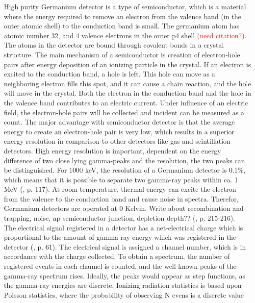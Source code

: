 High purity Germanium detector is a type of semiconductor, which is a material where the energy required to remove an electron from the valence band (in the outer atomic shell) to the conduction band is small. The germanium atom has atomic number 32, and 4 valence electrons in the outer p4 shell \textcolor{red}{(need citation?)}. The atoms in the detector are bound through covalent bonds in a crystal structure. The main mechanism of a semiconductor is creation of electron-hole pairs after energy deposition of an ionizing particle in the crystal. If an electron is excited to the conduction band, a hole is left. This hole can move as a neighboring electron fills this spot, and it can cause a chain reaction, and the hole will move in the crystal. Both the electron in the conduction band and the hole in the valence band contributes to an electric current. Under influence of an electric field, the electron-hole pairs will be collected and incident can be measured as a count. The major
advantage with semiconductor detector is that the average energy to create an electron-hole pair is
very low, which results in a superior energy resolution in comparison to other detectors like gas and
scintillation detectors. High energy resolution is important, dependent on the energy difference of two close lying gamma-peaks and the resolution, the two peaks can be distinguished. For 1000 keV, the resolution of a Germanium detector is 0.1\%, which means that it is possible to separate two gamma-ray peaks within ca. 1 MeV (\cite{Leo1994}, p. 117). At room temperature, thermal
energy can excite the electron from the valence to the conduction band and cause noise in spectra.
Therefor, Germanium detectors are operated at 0 Kelvin. Write about recombination and trapping,
noise, np semiconductor junction, depletion depth?? (\cite{Leo1994}, p. 215-216). \\

\noindent 
The electrical signal registered in a detector has a net-electrical charge which is proportional to the amount of gamma-ray energy which was registered in the detector (\cite{Gilmore2008}, p. 61). The electrical signal is assigned a channel number, which is in accordance with the charge collected. To obtain a spectrum, the number of registered events in each channel is counted, and the well-known peaks of the gamma-ray spectrum rises. Ideally, the peaks would appear as step functions, as the gamma-ray energies are discrete. Ionizing radiation statistics is based upon Poisson statistics, where the probability of observing N evens is a discrete value


